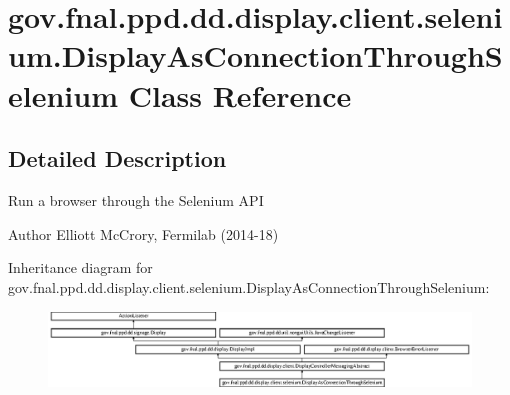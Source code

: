 \hypertarget{classgov_1_1fnal_1_1ppd_1_1dd_1_1display_1_1client_1_1selenium_1_1DisplayAsConnectionThroughSelenium}{\section{gov.\-fnal.\-ppd.\-dd.\-display.\-client.\-selenium.\-Display\-As\-Connection\-Through\-Selenium Class Reference}
\label{classgov_1_1fnal_1_1ppd_1_1dd_1_1display_1_1client_1_1selenium_1_1DisplayAsConnectionThroughSelenium}
}


\subsection{Detailed Description}
Run a browser through the Selenium A\-P\-I

\begin{DoxyAuthor}{Author}
Elliott Mc\-Crory, Fermilab (2014-\/18) 
\end{DoxyAuthor}
Inheritance diagram for gov.\-fnal.\-ppd.\-dd.\-display.\-client.\-selenium.\-Display\-As\-Connection\-Through\-Selenium\-:\begin{figure}[H]
\begin{center}
\leavevmode
\includegraphics[height=2.015839cm]{classgov_1_1fnal_1_1ppd_1_1dd_1_1display_1_1client_1_1selenium_1_1DisplayAsConnectionThroughSelenium}
\end{center}
\end{figure}
